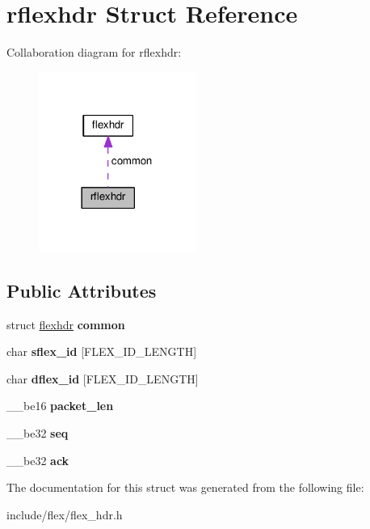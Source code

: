 \hypertarget{structrflexhdr}{}\section{rflexhdr Struct Reference}
\label{structrflexhdr}


Collaboration diagram for rflexhdr\+:\nopagebreak
\begin{figure}[H]
\begin{center}
\leavevmode
\includegraphics[width=146pt]{structrflexhdr__coll__graph}
\end{center}
\end{figure}
\subsection*{Public Attributes}
\begin{DoxyCompactItemize}
\item 
struct \hyperlink{structflexhdr}{flexhdr} {\bfseries common}\hypertarget{structrflexhdr_a0e80ead5eb57aba13d18f75f0906569c}{}\label{structrflexhdr_a0e80ead5eb57aba13d18f75f0906569c}

\item 
char {\bfseries sflex\+\_\+id} \mbox{[}F\+L\+E\+X\+\_\+\+I\+D\+\_\+\+L\+E\+N\+G\+TH\mbox{]}\hypertarget{structrflexhdr_aa79b53451e65228d567880e512cadc3e}{}\label{structrflexhdr_aa79b53451e65228d567880e512cadc3e}

\item 
char {\bfseries dflex\+\_\+id} \mbox{[}F\+L\+E\+X\+\_\+\+I\+D\+\_\+\+L\+E\+N\+G\+TH\mbox{]}\hypertarget{structrflexhdr_a091799a62ae442e024334d0eb4cb86b6}{}\label{structrflexhdr_a091799a62ae442e024334d0eb4cb86b6}

\item 
\+\_\+\+\_\+be16 {\bfseries packet\+\_\+len}\hypertarget{structrflexhdr_a2cc8c14fec43032de69ef360ffc4dfbe}{}\label{structrflexhdr_a2cc8c14fec43032de69ef360ffc4dfbe}

\item 
\+\_\+\+\_\+be32 {\bfseries seq}\hypertarget{structrflexhdr_a5ef194bf9db68ec8f6b050ca9608bd75}{}\label{structrflexhdr_a5ef194bf9db68ec8f6b050ca9608bd75}

\item 
\+\_\+\+\_\+be32 {\bfseries ack}\hypertarget{structrflexhdr_ae799b07034366e7e68c5b441f816e183}{}\label{structrflexhdr_ae799b07034366e7e68c5b441f816e183}

\end{DoxyCompactItemize}


The documentation for this struct was generated from the following file\+:\begin{DoxyCompactItemize}
\item 
include/flex/flex\+\_\+hdr.\+h\end{DoxyCompactItemize}
